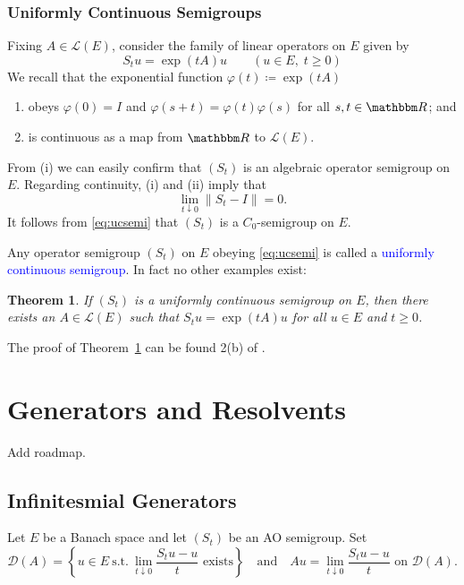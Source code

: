 \documentclass[12pt, reqno]{amsart}
\renewcommand{\geq}{\geqslant}
\newcommand{\st}{\ensuremath{\ \mathrm{s.t.}\ }}
\newcommand{\1}{\mathbbm 1}
\newcommand{\lL}{\mathcal L}
\newcommand{\dD}{\mathcal D}
\newcommand{\RR}{\mathbbm R}
\renewcommand{\phi}{\varphi}
\theoremstyle{plain}
\newtheorem{theorem}{Theorem}[section]
\theoremstyle{definition}
\newcommand{\navy}[1]{\textcolor{blue}{#1}}
\begin{document}
\subsubsection{Uniformly Continuous Semigroups}\label{ss:ucsemi}

Fixing $A \in \lL(E)$, consider the family of linear operators on $E$ given
by 
%
\begin{equation*}
    S_t u = \exp(t A) u
    \qquad (u \in E, \; t \geq 0)
\end{equation*}
%
We recall that the exponential function $\phi(t) \coloneq \exp(t A)$ 
%
\begin{enumerate}
    \item obeys $\phi(0) = I$ and $\phi(s + t) = \phi(t) \phi(s)$ for all $s, t
        \in \RR$; and
    \item is continuous as a map from $\RR$ to $\lL(E)$.
\end{enumerate}
%
From (i) we can easily confirm that $(S_t)$ is an algebraic operator semigroup
on $E$.  Regarding continuity, (i) and (ii) imply that
%
\begin{equation}\label{eq:ucsemi}
    \lim_{t \downarrow 0} \| S_t - I \| = 0.
\end{equation}
%
It follows from \eqref{eq:ucsemi} that $(S_t)$ is a $C_0$-semigroup on $E$.

Any operator semigroup $(S_t)$ on $E$ obeying \eqref{eq:ucsemi} is called a
\navy{uniformly continuous semigroup}.  In fact no other examples exist:

\begin{theorem}\label{t:ucsemi}
    If $(S_t)$ is a uniformly continuous semigroup on $E$, then there exists an
    $A \in \lL(E)$ such that $S_t u = \exp(t A) u$ for all $u \in E$ and $t \geq 0$.
\end{theorem}

The proof of Theorem~\ref{t:ucsemi} can be found 2(b) of \cite{engel2006short}.


\section{Generators and Resolvents}

Add roadmap.


\subsection{Infinitesmial Generators}

Let $E$ be a Banach space and let $(S_t)$ be an AO semigroup.  Set
%
\begin{equation*}
    \dD(A) =
    \left\{
        u \in E \st 
        \lim_{t \downarrow 0} \frac{S_t u - u}{t} \text{ exists}
    \right\}
    \quad \text{and} \quad
       Au = \lim_{t \downarrow 0} \frac{S_t u - u}{t} \text{ on }
       \dD(A).
\end{equation*}
\end{document}
